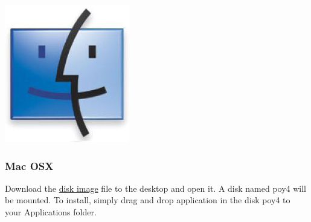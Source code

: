 \begin{flushleft}
	\begin{minipage}[c]{0.074\textwidth}
   		\includegraphics[width=\textwidth]{figures/figLogoMac.jpg}
	\end{minipage}
	\quad
	\begin{minipage}[t]{0.88\textwidth}
	   	\subsubsection{Mac OSX}
	\end{minipage}
            Download the
            \href{http://research.amnh.org/scicomp/projects/poy.php}{disk
            image} file to the desktop and open it. A disk named poy4 will be
            mounted.  To install, simply drag and drop \poy application in the
            disk poy4 to your Applications folder. 


\end{flushleft}
